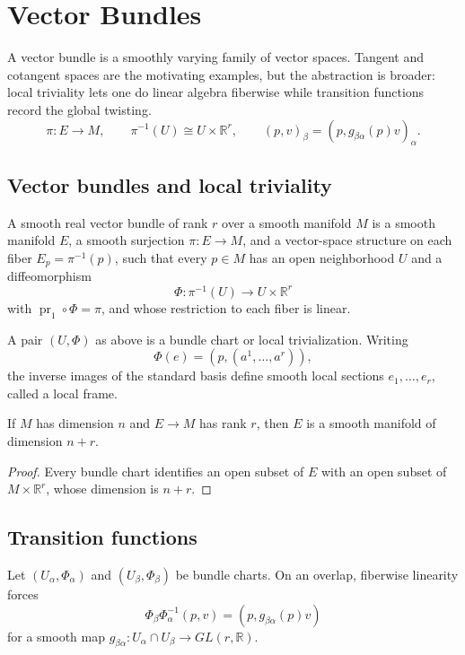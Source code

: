 \chapter{Vector Bundles}
\label{ch:vii07-vector-bundles}

A vector bundle is a smoothly varying family of vector spaces. Tangent and cotangent spaces are the motivating examples, but the abstraction is broader: local triviality lets one do linear algebra fiberwise while transition functions record the global twisting.
\[
\boxed{\pi:E\to M,\qquad \pi^{-1}(U)\cong U\times\mathbb R^r,\qquad
(p,v)_\beta=(p,g_{\beta\alpha}(p)v)_\alpha.}
\]

\section{Vector bundles and local triviality}
\begin{definition}\label{def:vii07-vector-bundle}
A smooth real vector bundle of rank \(r\) over a smooth manifold \(M\) is a smooth manifold \(E\), a smooth surjection \(\pi:E\to M\), and a vector-space structure on each fiber \(E_p=\pi^{-1}(p)\), such that every \(p\in M\) has an open neighborhood \(U\) and a diffeomorphism
\[
\Phi:\pi^{-1}(U)\longrightarrow U\times\mathbb R^r
\]
with \(\operatorname{pr}_1\circ\Phi=\pi\), and whose restriction to each fiber is linear.
\end{definition}

\begin{definition}\label{def:vii07-bundle-chart}
A pair \((U,\Phi)\) as above is a bundle chart or local trivialization. Writing
\[
\Phi(e)=(p,(a^1,\ldots,a^r)),
\]
the inverse images of the standard basis define smooth local sections \(e_1,\ldots,e_r\), called a local frame.
\end{definition}

\begin{proposition}\label{prop:vii07-total-dim}
If \(M\) has dimension \(n\) and \(E\to M\) has rank \(r\), then \(E\) is a smooth manifold of dimension \(n+r\).
\end{proposition}
\begin{proof}
Every bundle chart identifies an open subset of \(E\) with an open subset of \(M\times\mathbb R^r\), whose dimension is \(n+r\).
\end{proof}

\section{Transition functions}
Let \((U_\alpha,\Phi_\alpha)\) and \((U_\beta,\Phi_\beta)\) be bundle charts. On an overlap, fiberwise linearity forces
\[
\Phi_\beta\Phi_\alpha^{-1}(p,v)=(p,g_{\beta\alpha}(p)v)
\]
for a smooth map \(g_{\beta\alpha}:U_\alpha\cap U_\beta\to GL(r,\mathbb R)\).

